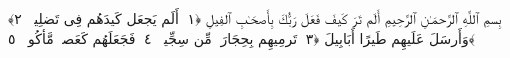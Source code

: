 
  
    
  
    
    

\nopagebreak
  بِسمِ ٱللَّهِ ٱلرَّحمَـٰنِ ٱلرَّحِيمِ
  أَلَم تَرَ كَيفَ فَعَلَ رَبُّكَ بِأَصحَـٰبِ ٱلفِيلِ ﴿١﴾
 أَلَم يَجعَل كَيدَهُم فِى تَضلِيلٍۢ ﴿٢﴾
 وَأَرسَلَ عَلَيهِم طَيرًا أَبَابِيلَ ﴿٣﴾
 تَرمِيهِم بِحِجَارَةٍۢ مِّن سِجِّيلٍۢ ﴿٤﴾
 فَجَعَلَهُم كَعَصفٍۢ مَّأكُولٍۭ ﴿٥﴾
 

